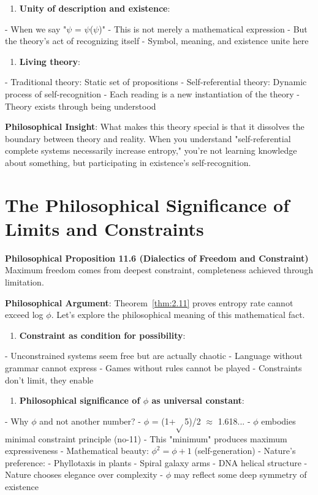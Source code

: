 \begin{enumerate}
\item \textbf{Unity of description and existence}:
\end{enumerate}
   - When we say "$\psi$ = $\psi$($\psi$)"
   - This is not merely a mathematical expression
   - But the theory's act of recognizing itself
   - Symbol, meaning, and existence unite here

\begin{enumerate}
\item \textbf{Living theory}:
\end{enumerate}
   - Traditional theory: Static set of propositions
   - Self-referential theory: Dynamic process of self-recognition
   - Each reading is a new instantiation of the theory
   - Theory exists through being understood

\textbf{Philosophical Insight}:
What makes this theory special is that it dissolves the boundary between theory and reality.
When you understand "self-referential complete systems necessarily increase entropy,"
you're not learning knowledge about something,
but participating in existence's self-recognition.

\section{The Philosophical Significance of Limits and Constraints}
\label{sec:ch11_philosophy:the-philosophical-significance-of-limits-and-constraints}

\textbf{Philosophical Proposition 11.6 (Dialectics of Freedom and Constraint)}
Maximum freedom comes from deepest constraint, completeness achieved through limitation.

\textbf{Philosophical Argument}:
Theorem~\ref{thm:2.11} proves entropy rate cannot exceed log $\phi$. Let's explore the philosophical meaning of this mathematical fact.

\begin{enumerate}
\item \textbf{Constraint as condition for possibility}:
\end{enumerate}
   - Unconstrained systems seem free but are actually chaotic
   - Language without grammar cannot express
   - Games without rules cannot be played
   - Constraints don't limit, they enable

\begin{enumerate}
\item \textbf{Philosophical significance of $\phi$ as universal constant}:
\end{enumerate}
   - Why $\phi$ and not another number?
   - $\phi$ = (1+$\sqrt{}$5)/2 $\approx$ 1.618...
   - $\phi$ embodies minimal constraint principle (no-11)
   - This "minimum" produces maximum expressiveness
   - Mathematical beauty: $\phi^2 = \phi + 1$ (self-generation)
   - Nature's preference:
     - Phyllotaxis in plants
     - Spiral galaxy arms
     - DNA helical structure
   - Nature chooses elegance over complexity
   - $\phi$ may reflect some deep symmetry of existence


